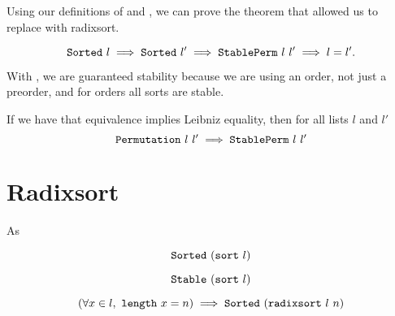 \documentclass[11pt]{thesis}
\begin{document}
Using our definitions of  and , we can
prove the theorem that allowed us to replace  with
radixsort.

\begin{theorem}
  \begin{equation*}
    \texttt{Sorted}~l \implies \texttt{Sorted}~l' \implies
    \texttt{StablePerm}~l~l' \implies l = l'.
  \end{equation*}
\end{theorem}

With , we are guaranteed stability because we are using
an order, not just a preorder, and for orders all sorts are stable.

\begin{theorem}
  If we have that equivalence implies Leibniz equality, then for all
  lists $l$ and $l'$
  \begin{equation*}
      \texttt{Permutation}~l~l' \implies \texttt{StablePerm}~l~l'
  \end{equation*}
\end{theorem}

\section{Radixsort}
\label{sec:sort}

As




\begin{theorem}
  \begin{equation*}
    \texttt{Sorted}~(\texttt{sort}~l)
  \end{equation*}
\end{theorem}

\begin{theorem}
  \begin{equation*}
    \texttt{Stable}~(\texttt{sort}~l)
  \end{equation*}
\end{theorem}



\begin{theorem}
  \begin{equation*}
    (\forall x \in l,~\texttt{length}~x = n) \implies \texttt{Sorted}~(\texttt{radixsort}~l~n)
  \end{equation*}
\end{theorem}
\end{document}
